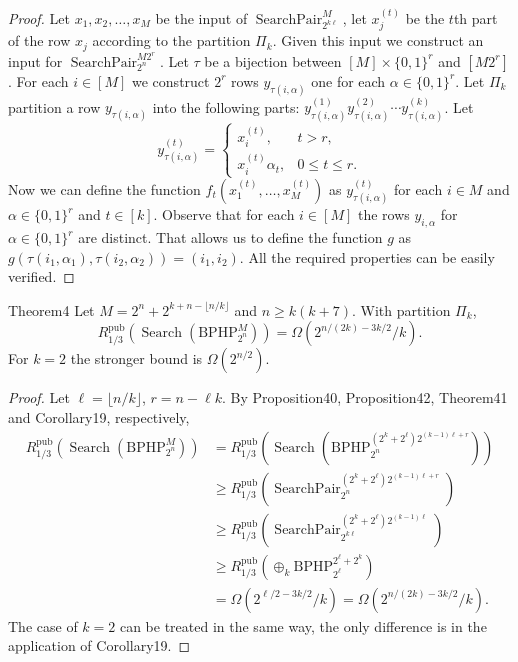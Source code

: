 \begin{proof}
Let $x_1,x_2,\ldots,x_M$ be the input of $\operatorname{SearchPair}_{2^{k\ell}}^M$, let $x_j^{(t)}$ be the $t$th part of the row $x_j$ according to the partition $\Pi_k$. Given this input we construct an input for $\operatorname{SearchPair}_{2^n}^{M2^r}$.
Let $\tau$ be a bijection between $[M]\times\{0,1\}^r$ and $[M2^r]$.
For each $i\in[M]$ we construct $2^r$ rows $y_{\tau(i,\alpha)}$ one for each $\alpha\in\{0,1\}^r$. Let $\Pi_k$ partition a row $y_{\tau(i,\alpha)}$ into the following parts: $y_{\tau(i,\alpha)}^{(1)}y_{\tau(i,\alpha)}^{(2)}\cdots y_{\tau(i,\alpha)}^{(k)}$. Let
\[
y_{\tau(i,\alpha)}^{(t)}
=\begin{cases}x_i^{(t)},&t>r,\\x_i^{(t)}\alpha_t,&0\le t\le r.\end{cases}
\]
Now we can define the function $f_t(x_1^{(t)},\ldots,x_M^{(t)})$ as $y_{\tau(i,\alpha)}^{(t)}$ for each $i\in M$ and $\alpha\in\{0,1\}^r$ and $t\in[k]$. Observe that for each $i\in[M]$ the rows $y_{i,\alpha}$ for $\alpha\in\{0,1\}^r$ are distinct. That allows us to define the function $g$ as $g(\tau(i_1,\alpha_1),\tau(i_2,\alpha_2))=(i_1,i_2)$. All the required properties can be easily verified.
\end{proof}
\begin{authorclaim}{Theorem4}
Let $M=2^n+2^{k+n-\lfloor n/k\rfloor}$ and $n\ge k(k+7)$. With partition $\Pi_k$,
\[
R^{\mathrm{pub}}_{1/3}(\operatorname{Search}(\mathrm{BPHP}_{2^n}^M))
=\Omega(2^{n/(2k)-3k/2}/k).
\]
For $k=2$ the stronger bound is $\Omega(2^{n/2})$.
\end{authorclaim}
\begin{proof}
Let $\ell=\lfloor n/k\rfloor$, $r=n-\ell k$. By Proposition40, Proposition42, Theorem41 and Corollary19, respectively,
\begin{align*}
R^{\mathrm{pub}}_{1/3}(\operatorname{Search}(\mathrm{BPHP}_{2^n}^M))
&=R^{\mathrm{pub}}_{1/3}(\operatorname{Search}(\mathrm{BPHP}_{2^n}^{(2^k+2^\ell)2^{(k-1)\ell+r}}))\\
&\ge R^{\mathrm{pub}}_{1/3}(\operatorname{SearchPair}_{2^n}^{(2^k+2^\ell)2^{(k-1)\ell+r}})\\
&\ge R^{\mathrm{pub}}_{1/3}(\operatorname{SearchPair}_{2^{k\ell}}^{(2^k+2^\ell)2^{(k-1)\ell}})\\
&\ge R^{\mathrm{pub}}_{1/3}(\oplus_k\mathrm{BPHP}_{2^\ell}^{2^\ell+2^k})\\
&=\Omega(2^{\ell/2-3k/2}/k)=\Omega(2^{n/(2k)-3k/2}/k).
\end{align*}
The case of $k=2$ can be treated in the same way, the only difference is in the application of Corollary19.
\end{proof}

